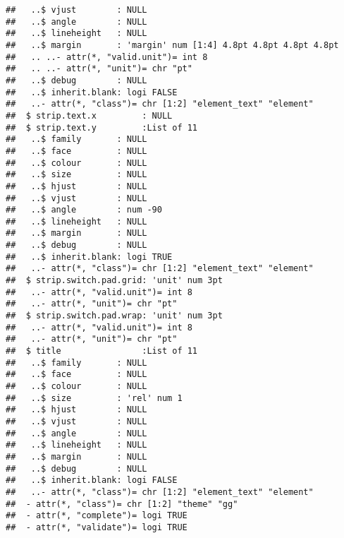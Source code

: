 \documentclass[]{article}
\begin{document}
\begin{verbatim}
##   ..$ vjust        : NULL
##   ..$ angle        : NULL
##   ..$ lineheight   : NULL
##   ..$ margin       : 'margin' num [1:4] 4.8pt 4.8pt 4.8pt 4.8pt
##   .. ..- attr(*, "valid.unit")= int 8
##   .. ..- attr(*, "unit")= chr "pt"
##   ..$ debug        : NULL
##   ..$ inherit.blank: logi FALSE
##   ..- attr(*, "class")= chr [1:2] "element_text" "element"
##  $ strip.text.x         : NULL
##  $ strip.text.y         :List of 11
##   ..$ family       : NULL
##   ..$ face         : NULL
##   ..$ colour       : NULL
##   ..$ size         : NULL
##   ..$ hjust        : NULL
##   ..$ vjust        : NULL
##   ..$ angle        : num -90
##   ..$ lineheight   : NULL
##   ..$ margin       : NULL
##   ..$ debug        : NULL
##   ..$ inherit.blank: logi TRUE
##   ..- attr(*, "class")= chr [1:2] "element_text" "element"
##  $ strip.switch.pad.grid: 'unit' num 3pt
##   ..- attr(*, "valid.unit")= int 8
##   ..- attr(*, "unit")= chr "pt"
##  $ strip.switch.pad.wrap: 'unit' num 3pt
##   ..- attr(*, "valid.unit")= int 8
##   ..- attr(*, "unit")= chr "pt"
##  $ title                :List of 11
##   ..$ family       : NULL
##   ..$ face         : NULL
##   ..$ colour       : NULL
##   ..$ size         : 'rel' num 1
##   ..$ hjust        : NULL
##   ..$ vjust        : NULL
##   ..$ angle        : NULL
##   ..$ lineheight   : NULL
##   ..$ margin       : NULL
##   ..$ debug        : NULL
##   ..$ inherit.blank: logi FALSE
##   ..- attr(*, "class")= chr [1:2] "element_text" "element"
##  - attr(*, "class")= chr [1:2] "theme" "gg"
##  - attr(*, "complete")= logi TRUE
##  - attr(*, "validate")= logi TRUE
\end{verbatim}
\end{document}
